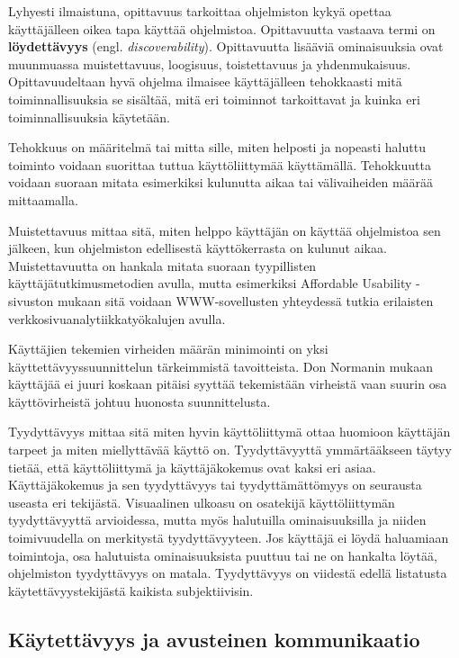\documentclass[utf8]{gradu3}
\begin{document}
Lyhyesti ilmaistuna, opittavuus tarkoittaa ohjelmiston kykyä opettaa käyttäjälleen oikea tapa käyttää ohjelmistoa. Opittavuutta vastaava termi on \textbf{löydettävyys} (engl. \textit{discoverability}). Opittavuutta lisääviä ominaisuuksia ovat muunmuassa muistettavuus, loogisuus, toistettavuus ja yhdenmukaisuus. Opittavuudeltaan hyvä ohjelma ilmaisee käyttäjälleen tehokkaasti mitä toiminnallisuuksia se sisältää, mitä eri toiminnot tarkoittavat ja kuinka eri toiminnallisuuksia käytetään. \parencite[]{improving-learnability}

Tehokkuus on määritelmä tai mitta sille, miten helposti ja nopeasti haluttu toiminto voidaan suorittaa tuttua käyttöliittymää käyttämällä. Tehokkuutta voidaan suoraan mitata esimerkiksi kulunutta aikaa tai välivaiheiden määrää mittaamalla. 

Muistettavuus mittaa sitä, miten helppo käyttäjän on käyttää ohjelmistoa sen jälkeen, kun ohjelmiston edellisestä käyttökerrasta on kulunut aikaa. Muistettavuutta on hankala mitata suoraan tyypillisten käyttäjätutkimusmetodien avulla, mutta esimerkiksi Affordable Usability -sivuston \parencite[]{affordable-usability} mukaan sitä voidaan WWW-sovellusten yhteydessä tutkia erilaisten verkkosivuanalytiikkatyökalujen avulla.

Käyttäjien tekemien virheiden määrän minimointi on yksi käyttettävyyssuunnittelun tärkeimmistä tavoitteista. Don Normanin \parencite[]{norman-doet} mukaan  käyttäjää ei juuri koskaan pitäisi syyttää tekemistään virheistä vaan suurin osa käyttövirheistä johtuu huonosta suunnittelusta.

Tyydyttävyys mittaa sitä miten hyvin käyttöliittymä ottaa huomioon käyttäjän tarpeet ja miten miellyttävää käyttö on. Tyydyttävyyttä ymmärtääkseen täytyy tietää, että käyttöliittymä ja käyttäjäkokemus ovat kaksi eri asiaa. Käyttäjäkokemus ja sen tyydyttävyys tai tyydyttämättömyys on seurausta useasta eri tekijästä. Visuaalinen ulkoasu on osatekijä käyttöliittymän tyydyttävyyttä arvioidessa, mutta myös halutuilla ominaisuuksilla ja niiden toimivuudella on merkitystä tyydyttävyyteen. Jos käyttäjä ei löydä haluamiaan toimintoja, osa halutuista ominaisuuksista puuttuu tai ne on hankalta löytää, ohjelmiston tyydyttävyys on matala. Tyydyttävyys on viidestä edellä listatusta käytettävyystekijästä kaikista subjektiivisin.

\subsection{Käytettävyys ja avusteinen kommunikaatio}
\end{document}
